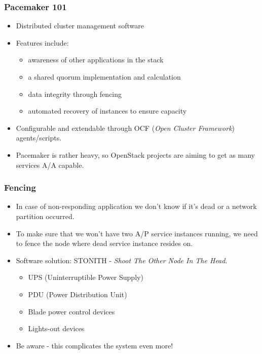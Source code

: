 \documentclass[aspectratio=169]{beamer}
\begin{document}
\begin{frame}
    \frametitle{Pacemaker 101}
    \begin{itemize}
        \item Distributed cluster management software
        \item Features include:
        \begin{itemize}
            \item awareness of other applications in the stack
            \item a shared quorum implementation and calculation
            \item data integrity through fencing
            \item automated recovery of instances to ensure capacity
        \end{itemize}
        \item Configurable and extendable through OCF (\emph{Open Cluster Framework}) agents/scripts.
        \item Pacemaker is rather heavy, so OpenStack projects are aiming to get as many services A/A capable.
    \end{itemize}
\end{frame}

\begin{frame}
    \frametitle{Fencing}
    \begin{itemize}
        \item In case of non-responding application we don't know if it's dead or a network partition occurred.
        \item To make sure that we won't have two A/P service instances running, we need to fence the node where dead service instance resides on.
        \pause
        \item Software solution: STONITH - \emph{Shoot The Other Node In The Head}.
        \begin{itemize}
            \item UPS (Uninterruptible Power Supply)
            \item PDU (Power Distribution Unit)
            \item Blade power control devices
            \item Lights-out devices
        \end{itemize}
        \item Be aware - this complicates the system even more!
    \end{itemize}
\end{frame}
\end{document}
